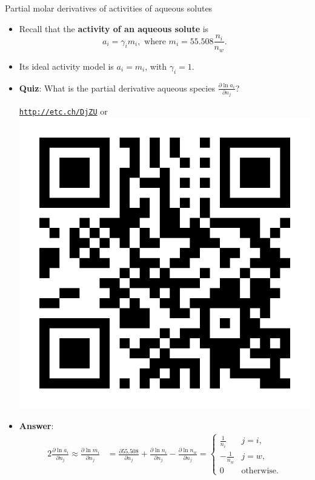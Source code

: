 \begin{frame}{Partial molar derivatives of activities of aqueous solutes}
\begin{itemize}
\item Recall that the {\bf activity of an aqueous solute} is
\[
a_{i}=\gamma_{i}m_{i},\text{ where }m_{i}=55.508\frac{n_{i}}{n_{w}}.
\]
\pause
\item Its ideal activity model is $a_{i}=m_{i}$, with $\gamma_{i}=1$.
\pause
\item \alert{\bf Quiz}: What is the partial derivative  aqueous species $\frac{\partial\ln a_{i}}{\partial n_{j}}$?
\vskip 5pt
\begin{center}
	\href{http://etc.ch/DjZU}{\textcolor{indigo(dye)}{\tt http://etc.ch/DjZU}} \quad or \quad 
	\includegraphics[height=0.08\columnwidth]{figures/numerical-methods-chemical-equilibrium/polls.png}
\end{center}
%
\hiddenpause
%
\item \alert{\bf Answer}: 
\begin{alignat*}{2}
\tfrac{\partial\ln a_{i}}{\partial n_{j}}
\approx\tfrac{\partial\ln m_{i}}{\partial n_{j}} 
& 
	= \tfrac{\partial55.508}{\partial n_j} 
  + \tfrac{\partial\ln n_{i}}{\partial n_{j}}
  - \tfrac{\partial\ln n_{w}}{\partial n_{j}}
         = \begin{cases}
         	\tfrac{1}{n_{i}} & j=i,\\
         	-\tfrac{1}{n_{w}} & j=w,\\
         	0 & \text{otherwise}.
         \end{cases}
\end{alignat*}
%
\hiddenpause

\end{itemize}
\end{frame}
%
